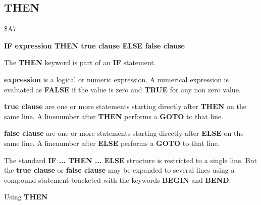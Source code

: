 \subsection{THEN}
\begin{description}[leftmargin=3cm,style=nextline]
\item [Token:] \$A7
\item [Format:] {\bf IF expression THEN true clause ELSE false clause}
\item [Usage:] The {\bf THEN} keyword is part of an {\bf IF}
               statement.

               {\bf expression} is a logical or numeric expression.
               A numerical expression is evaluated as {\bf FALSE}
               if the value is zero and {\bf TRUE} for any non zero
               value.

               {\bf true clause} are one or more statements starting
               directly after {\bf THEN} on the same line.
               A linenumber after {\bf THEN} performs a
               {\bf GOTO} to that line.

               {\bf false clause} are one or more statements starting
               directly after {\bf ELSE} on the same line.
               A linenumber after {\bf ELSE} performs a
               {\bf GOTO} to that line.

\item [Remarks:]
               The standard {\bf IF ... THEN ... ELSE} structure
               is restricted to a single line. But the {\bf true clause}
               or {\bf false clause} may be expanded to several lines
               using a compound statement bracketed with the keywords
               {\bf BEGIN} and {\bf BEND}.
\item [Example:]
                Using {\bf THEN}
\end{description}

